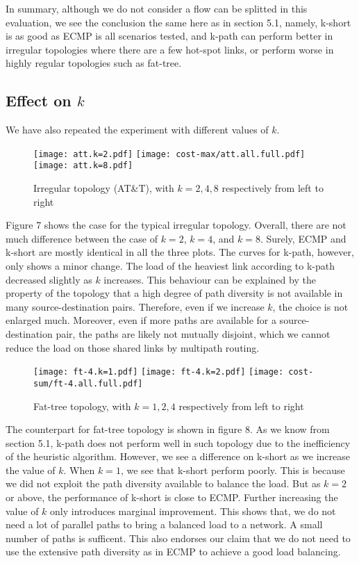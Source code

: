\documentclass[conference]{IEEEtran}
\begin{document}
In summary, although we do not consider a flow can be splitted in this
evaluation, we see the conclusion the same here as in section 5.1, namely,
k-short is as good as ECMP is all scenarios tested, and k-path can perform
better in irregular topologies where there are a few hot-spot links, or perform
worse in highly regular topologies such as fat-tree.

\subsection{Effect on $k$}

We have also repeated the experiment with different values of $k$.

\begin{figure*}
\texttt{[image: att.k=2.pdf]}%
\texttt{[image: cost-max/att.all.full.pdf]}%
\texttt{[image: att.k=8.pdf]}
\caption{Irregular topology (AT\&T), with $k=2,4,8$ respectively from left to right}
\end{figure*}

Figure 7 shows the case for the typical irregular topology. Overall, there are
not much difference between the case of $k=2$, $k=4$, and $k=8$. Surely, ECMP
and k-short are mostly identical in all the three plots. The curves for k-path,
however, only shows a minor change. The load of the heaviest link according to
k-path decreased slightly as $k$ increases. This behaviour can be explained by
the property of the topology that a high degree of path diversity is not
available in many source-destination pairs. Therefore, even if we increase $k$,
the choice is not enlarged much. Moreover, even if more paths are available for
a source-destination pair, the paths are likely not mutually disjoint, which we
cannot reduce the load on those shared links by multipath routing.

\begin{figure*}
\texttt{[image: ft-4.k=1.pdf]}%
\texttt{[image: ft-4.k=2.pdf]}%
\texttt{[image: cost-sum/ft-4.all.full.pdf]}
\caption{Fat-tree topology, with $k=1,2,4$ respectively from left to right}
\end{figure*}

The counterpart for fat-tree topology is shown in figure 8. As we know from
section 5.1, k-path does not perform well in such topology due to the
inefficiency of the heuristic algorithm. However, we see a difference on
k-short as we increase the value of $k$. When $k=1$, we see that k-short
perform poorly. This is because we did not exploit the path diversity available
to balance the load. But as $k=2$ or above, the performance of k-short is close
to ECMP. Further increasing the value of $k$ only introduces marginal
improvement. This shows that, we do not need a lot of parallel paths to bring a
balanced load to a network. A small number of paths is sufficent. This also
endorses our claim that we do not need to use the extensive path diversity as
in ECMP to achieve a good load balancing.

\balance



\label{docend}
\end{document}
